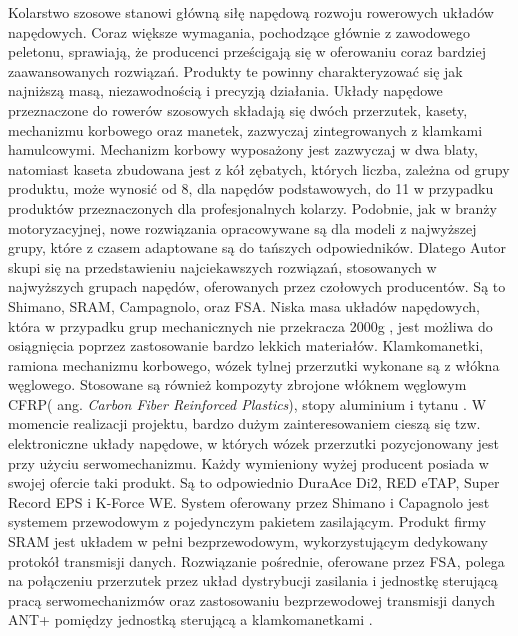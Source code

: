 Kolarstwo szosowe stanowi główną siłę napędową rozwoju rowerowych układów napędowych. Coraz większe wymagania, pochodzące głównie z zawodowego peletonu, sprawiają, że producenci prześcigają się w oferowaniu coraz bardziej zaawansowanych rozwiązań. Produkty te powinny charakteryzować się jak najniższą masą, niezawodnością i precyzją działania. Układy napędowe przeznaczone do rowerów szosowych składają się dwóch przerzutek, kasety, mechanizmu korbowego oraz manetek, zazwyczaj zintegrowanych z klamkami hamulcowymi. Mechanizm korbowy wyposażony jest zazwyczaj w dwa blaty, natomiast kaseta zbudowana jest z kół zębatych, których liczba, zależna od grupy produktu, może wynosić od 8, dla napędów podstawowych, do 11 w przypadku produktów przeznaczonych dla profesjonalnych kolarzy. Podobnie, jak w branży motoryzacyjnej, nowe rozwiązania opracowywane są dla modeli z najwyższej grupy, które z czasem adaptowane są do tańszych odpowiedników. Dlatego Autor skupi się na przedstawieniu najciekawszych rozwiązań, stosowanych w najwyższych grupach napędów, oferowanych przez czołowych producentów. Są to Shimano, SRAM, Campagnolo, oraz FSA. Niska masa układów napędowych, która w przypadku grup mechanicznych nie przekracza 2000g \cite{roadGroupSetWeights}, jest możliwa do osiągnięcia poprzez zastosowanie bardzo lekkich materiałów. Klamkomanetki, ramiona mechanizmu korbowego, wózek tylnej przerzutki wykonane są z włókna węglowego. Stosowane są również kompozyty zbrojone włóknem węglowym CFRP( ang. \textit{Carbon Fiber Reinforced Plastics}), stopy aluminium i tytanu \cite{shimanoDuraAce}. W momencie realizacji projektu, bardzo dużym zainteresowaniem cieszą się tzw. elektroniczne układy napędowe, w których wózek przerzutki pozycjonowany jest przy użyciu serwomechanizmu. Każdy wymieniony wyżej producent posiada w swojej ofercie taki produkt. Są to odpowiednio DuraAce Di2, RED eTAP, Super Record EPS i K-Force WE. System oferowany przez Shimano i Capagnolo jest systemem przewodowym z pojedynczym pakietem zasilającym. Produkt firmy SRAM jest układem w pełni bezprzewodowym, wykorzystującym dedykowany protokół transmisji danych. Rozwiązanie pośrednie, oferowane przez FSA, polega na połączeniu przerzutek przez układ dystrybucji zasilania i jednostkę sterującą pracą serwomechanizmów oraz zastosowaniu bezprzewodowej transmisji danych ANT+ pomiędzy jednostką sterującą a klamkomanetkami \cite{kforce}.

